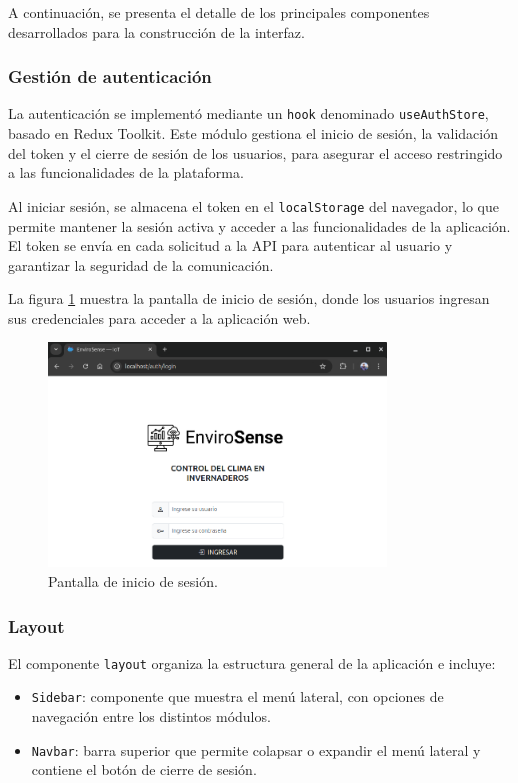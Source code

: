 A continuación, se presenta el detalle de los principales componentes
desarrollados para la construcción de la interfaz.

\subsubsection{Gestión de autenticación}

La autenticación se implementó mediante un \texttt{hook} denominado
\texttt{useAuthStore}, basado en Redux Toolkit. Este módulo gestiona el inicio
de sesión, la validación del token y el cierre de sesión de los usuarios, para
asegurar el acceso restringido a las funcionalidades de la plataforma.

Al iniciar sesión, se almacena el token en el \texttt{localStorage} del
navegador, lo que permite mantener la sesión activa y acceder a las
funcionalidades de la aplicación. El token se envía en cada solicitud a la API
para autenticar al usuario y garantizar la seguridad de la comunicación.

La figura \ref{fig:login_sistema} muestra la pantalla de inicio de sesión,
donde los usuarios ingresan sus credenciales para acceder a la aplicación web.

\begin{figure}[H]
    \centering
    \includegraphics[width=0.80\textwidth]{./Images/24_login.png}
    \caption{Pantalla de inicio de sesión.}
    \label{fig:login_sistema}
\end{figure}

\subsubsection{Layout}

El componente \texttt{layout} organiza la estructura general de la aplicación e
incluye:
\begin{itemize}
    \item \texttt{Sidebar}: componente que muestra el menú lateral, con opciones de navegación
          entre los distintos módulos.
    \item \texttt{Navbar}: barra superior que permite colapsar o expandir el menú lateral y
          contiene el botón de cierre de sesión.
\end{itemize}


